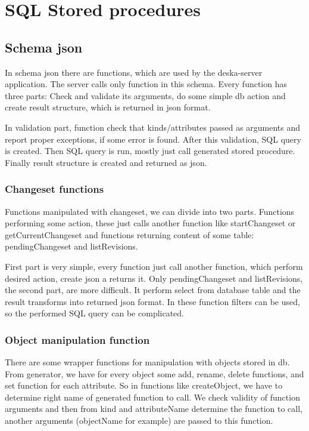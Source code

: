 \documentclass[deska]{subfiles}
\begin{document}
\chapter{SQL Stored procedures}
\label{sec:sql-procedures}

\begin{abstract}
\end{abstract}

\section{Schema json}
In schema json there are functions, which are used by the deska-server application. The server calls only function in this schema. Every function has three parts: Check and validate its arguments, do some simple db action and create result structure, which is returned in json format.

In validation part, function check that kinds/attributes passed as arguments and report proper exceptions, if some error is found.
After this validation, SQL query is created. Then SQL query is run, mostly just call generated stored procedure. Finally result structure is created and returned as json.

\subsection{Changeset functions}
Functions manipulated with changeset, we can divide into two parts. Functions performing some action, these just calls another function like startChangeset or getCurrentChangeset and functions returning content of some table: pendingChangeset and listRevisions.

First part is very simple, every function just call another function, which perform desired action, create json a returns it.
Only pendingChangeset and listRevisions, the second part, are more difficult. It perform select from database table and the result transforms into returned json format. In these function filters can be used, so the performed SQL query can be complicated.

\subsection{Object manipulation function}
There are some wrapper functions for manipulation with objects stored in db. From generator, we have for every object some add, rename, delete functions, and set function for each attribute. So in functions like createObject, we have to determine right name of generated function to call. We check validity of function arguments and then from kind and attributeName determine the function to call, another arguments (objectName for example) are passed to this function.
\end{document}
